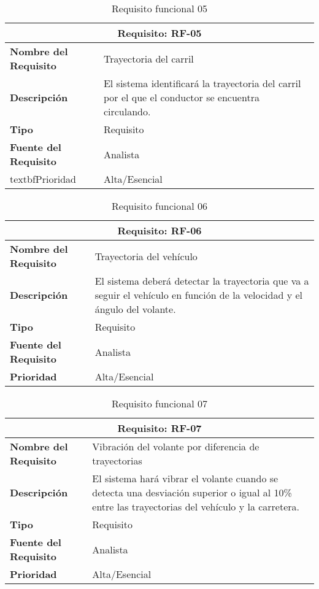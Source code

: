 \begin{table}[H]
\begin{center}
\begin{tabular}{p{} p{7cm}}
\multicolumn{2}{c}{\textbf{Requisito: RF-05} } \\
\hline \hline
\textbf{Nombre del Requisito} & Trayectoria del carril\\
\hline
\textbf{Descripción} & El sistema identificará la trayectoria del carril por el que el conductor se encuentra circulando. \\
\hline
\textbf{Tipo} & Requisito  \\
\hline
\textbf{Fuente del Requisito} & Analista \\
\hline
textbf{Prioridad} & Alta/Esencial  \\ \hline
\end{tabular}
\caption{Requisito funcional 05}
\label{tab:RF-05}
\end{center}
\end{table}

\begin{table}[H]
\begin{center}
\begin{tabular}{p{} p{7cm}}
\multicolumn{2}{c}{\textbf{Requisito: RF-06} } \\
\hline \hline
\textbf{Nombre del Requisito} & Trayectoria del vehículo\\
\hline
\textbf{Descripción} & El sistema deberá detectar la trayectoria que va a seguir el vehículo en función de la velocidad y el ángulo del volante. \\
\hline
\textbf{Tipo} & Requisito  \\
\hline
\textbf{Fuente del Requisito} & Analista \\
\hline
\textbf{Prioridad} & Alta/Esencial  \\ \hline
\end{tabular}
\caption{Requisito funcional 06}
\label{tab:RF-06}
\end{center}
\end{table}

\begin{table}[H]
\begin{center}
\begin{tabular}{p{} p{7cm}}
\multicolumn{2}{c}{\textbf{Requisito: RF-07} } \\
\hline \hline
\textbf{Nombre del Requisito} &  Vibración del volante por diferencia de trayectorias\\
\hline
\textbf{Descripción} & El sistema hará vibrar el volante cuando se detecta una desviación superior o igual al 10\% entre las trayectorias del vehículo y la carretera. \\
\hline
\textbf{Tipo} & Requisito  \\
\hline
\textbf{Fuente del Requisito} & Analista \\
\hline
\textbf{Prioridad} & Alta/Esencial  \\ \hline
\end{tabular}
\caption{Requisito funcional 07}
\label{tab:RF-07}
\end{center}
\end{table}

